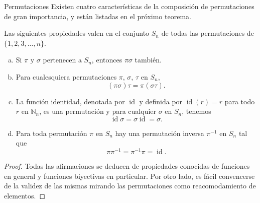 \begin{section}{Permutaciones}
Existen cuatro características de la composición de permutaciones de gran importancia, y están listadas en el próximo teorema.

\begin{teorema}\label{tA3} Las siguientes propiedades valen en el conjunto $S_n$ de todas las permutaciones de $\{1,2,3,...,n\}$.
\begin{enumerate}[a)]
\item Si $\pi$ y $\sigma$ pertenecen a $S_n$, entonces $\pi\sigma$ también.
\item Para cualesquiera permutaciones $\pi$, $\sigma$, $\tau$ en $S_n$,
$$
(\pi\sigma)\tau=\pi(\sigma\tau).$$
\item La función identidad, denotada por $\operatorname{id}$ y definida por $\operatorname{id}(r) =r$ para todo $r$ en $\mathbb N_n$, es una permutación y para cualquier $\sigma$ en $S_n$,
tenemos
$$
\operatorname{id}\sigma=\sigma\operatorname{id}=\sigma.$$
\item Para toda permutación $\pi$ en $S_n$ hay una permutación inversa $\pi^{-1}$ en $S_n$ tal que
$$
\pi\pi^{-1} = \pi^{-1}\pi = \operatorname{id}.
$$
\end{enumerate}
\end{teorema}
\begin{proof} Todas las afirmaciones se deducen de propiedades conocidas de funciones en general y funciones biyectivas en particular. Por otro lado, es fácil convencerse de la validez de las mismas mirando las permutaciones como reacomodamiento de elementos. 
\end{proof}



\end{section}
